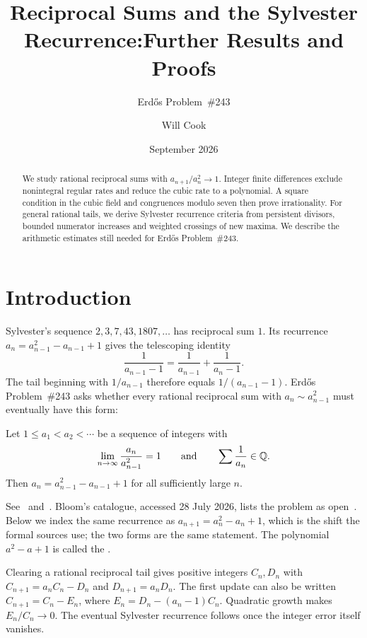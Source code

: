 \documentclass[11pt]{article}
\title{Reciprocal Sums and the Sylvester Recurrence:\newline Further Results and Proofs}
\subtitle{Erd\H{o}s Problem~\#243}
\author{Will Cook}
\date{September 2026}
\begin{document}
\maketitle
\noteprovenance

\begin{abstract}
We study rational reciprocal sums with $a_{n+1}/a_n^2\to1$.
Integer finite differences exclude nonintegral regular rates and reduce
the cubic rate to a polynomial. A square condition in the cubic field
and congruences modulo seven then prove irrationality.
For general rational tails, we derive Sylvester recurrence criteria
from persistent divisors, bounded numerator increases and weighted
crossings of new maxima. We describe the arithmetic estimates still
needed for Erd\H{o}s Problem~\#243.
\end{abstract}

\section{Introduction}\label{long243:sec:problem}
Sylvester's sequence $2,3,7,43,1807,\ldots$ has reciprocal sum $1$.
Its recurrence $a_n=a_{n-1}^2-a_{n-1}+1$ gives the telescoping identity
\[
 \frac1{a_{n-1}-1}=\frac1{a_{n-1}}+\frac1{a_n-1}.
\]
The tail beginning with $1/a_{n-1}$ therefore equals $1/(a_{n-1}-1)$.
Erd\H{o}s Problem~\#243 asks whether every rational reciprocal sum
with $a_n\sim a_{n-1}^2$ must eventually have this form:

\begin{problem}[Erd\H{o}s \#243]\label{long243:res:problem}
Let $1\le a_1<a_2<\cdots$ be a sequence of integers with
\[
 \lim_{n\to\infty}\frac{a_n}{a_{n-1}^{2}}=1
 \qquad\text{and}\qquad
 \sum\frac{1}{a_n}\in\mathbb{Q} .
\]
Then $a_n=a_{n-1}^{2}-a_{n-1}+1$ for all sufficiently large $n$.
\end{problem}

\noindent See~\cite[p.~64]{erdosgraham1980} and~\cite[p.~105]{erdos1988}.
Bloom's catalogue, accessed 28 July 2026, lists the problem as
open~\cite{erdosproblems}.
Below we index the same recurrence as
$a_{n+1}=a_n^{2}-a_n+1$, which is the shift the formal sources use; the two
forms are the same statement. The polynomial $a^2-a+1$ is called the
.

Clearing a rational reciprocal tail gives positive integers $C_n,D_n$
with $C_{n+1}=a_nC_n-D_n$ and $D_{n+1}=a_nD_n$. The first update
can also be written $C_{n+1}=C_n-E_n$, where
$E_n=D_n-(a_n-1)C_n$. Quadratic growth makes $E_n/C_n\to0$.
The eventual Sylvester recurrence follows once the integer error itself
vanishes.
\end{document}

